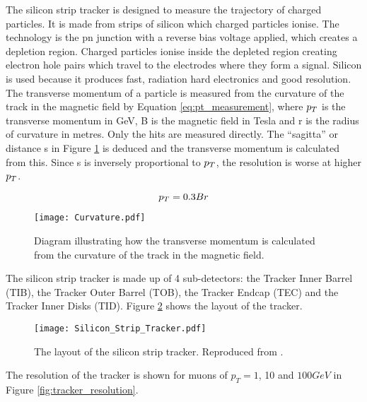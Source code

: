 The silicon strip tracker is designed to measure the trajectory of charged 
particles. It is made from strips of silicon which charged particles ionise. The
technology is the pn junction with a reverse bias voltage applied, which creates
a depletion region. Charged particles ionise inside the depleted region creating
electron hole pairs which travel to the electrodes where they form a signal. 
Silicon is used because it produces fast, radiation hard electronics and good
resolution. \\
  
The transverse momentum of a particle is measured from the curvature of the 
track in the magnetic field by Equation \ref{eq:pt_measurement}, where $p_{T}$ is
the transverse momentum in GeV, B is the magnetic field in Tesla and r is the
radius of curvature in metres. Only the hits are measured directly. The 
``sagitta'' or distance s in Figure \ref{fig:curvature} is deduced and the 
transverse momentum is calculated from this. Since s is inversely proportional 
to $p_{T}$, the resolution is worse at higher $p_{T}$.

\begin{equation}
p_{T} = 0.3Br
\label{eq:pt_measurement}
\end{equation}

\begin{figure}
\begin{center}
\texttt{[image: Curvature.pdf]}
\end{center}
\caption{Diagram illustrating how the transverse momentum is calculated from the
curvature of the track in the magnetic field.}
\label{fig:curvature}
\end{figure}

The silicon strip tracker is made up of 4 sub-detectors: the Tracker Inner 
Barrel (TIB), the Tracker Outer Barrel (TOB), the Tracker Endcap (TEC) and the
Tracker Inner Disks (TID). Figure \ref{fig:Silicon_Strip_Tracker} shows the 
layout of the tracker. \\

\begin{figure}
\texttt{[image: Silicon\_Strip\_Tracker.pdf]}
\caption{The layout of the silicon strip tracker. Reproduced from 
\cite{physics_tdr_1}.}
\label{fig:Silicon_Strip_Tracker}
\end{figure}

The resolution of the tracker is shown for muons of $p_{T} = 1$, 10 and $100 
\unit{GeV}$ in Figure \ref{fig:tracker_resolution}.


